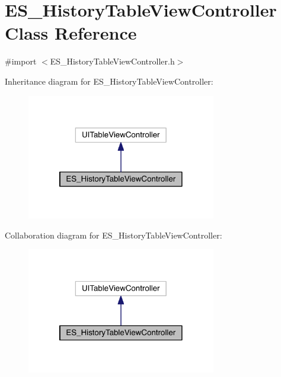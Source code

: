 \hypertarget{interface_e_s___history_table_view_controller}{\section{E\+S\+\_\+\+History\+Table\+View\+Controller Class Reference}
\label{interface_e_s___history_table_view_controller}
}


{\ttfamily \#import $<$E\+S\+\_\+\+History\+Table\+View\+Controller.\+h$>$}



Inheritance diagram for E\+S\+\_\+\+History\+Table\+View\+Controller\+:\nopagebreak
\begin{figure}[H]
\begin{center}
\leavevmode
\includegraphics[width=234pt]{df/d77/interface_e_s___history_table_view_controller__inherit__graph}
\end{center}
\end{figure}


Collaboration diagram for E\+S\+\_\+\+History\+Table\+View\+Controller\+:\nopagebreak
\begin{figure}[H]
\begin{center}
\leavevmode
\includegraphics[width=234pt]{dc/d6c/interface_e_s___history_table_view_controller__coll__graph}
\end{center}
\end{figure}
